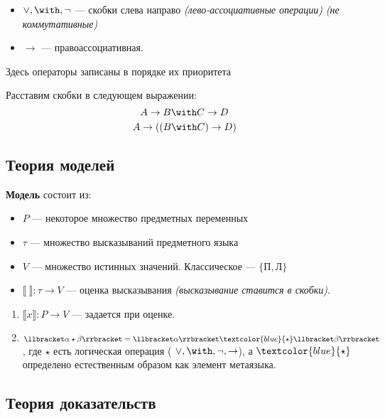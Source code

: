 \begin{itemize}
    \item \(\lor, \with, \neg\) --- скобки слева направо \textit{(лево-ассоциативные операции)} \textit{(не коммутативные)}
    \item \( \to \) --- правоассоциативная.
\end{itemize}

\begin{remark}
    Здесь операторы записаны в порядке их приоритета
\end{remark}

\begin{example}
    Расставим скобки в следующем выражении:
    \[A \to B \with C \to D\]
    \[A \to ((B \with C) \to D)\]
\end{example}

\subsection{Теория моделей}

\textbf{Модель} состоит из:
\begin{obozn}\itemfix
    \begin{itemize}
        \item \(P\) --- некоторое множество предметных переменных
        \item \(\tau\) --- множество высказываний предметного языка
        \item \(V\) --- множество истинных значений. Классическое --- \(\{\text{П}, \text{Л}\}\)
        \item \(\llbracket\ \rrbracket : \tau \to V\) --- оценка высказывания \textit{(высказывание ставится в скобки)}.
    \end{itemize}
\end{obozn}

\begin{enumerate}
    \item \(\llbracket x \rrbracket : P \to V\) --- задается при оценке. %
    \item \(\llbracket \alpha \star \beta \rrbracket = \llbracket \alpha \rrbracket \textcolor{blue}{\star} \llbracket \beta \rrbracket\), где \(\star\) есть логическая операция ( \(\lor, \with, \neg, \to\)), а \(\textcolor{blue}{\star}\) определено естественным образом как элемент метаязыка.
\end{enumerate}

\subsection{Теория доказательств}

